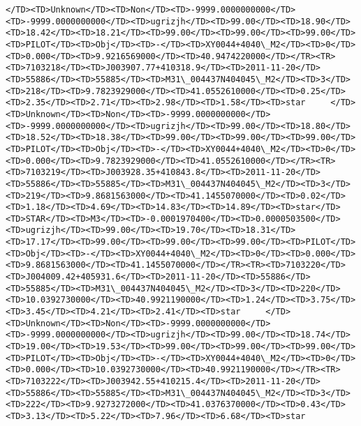 \documentclass[11pt]{article}
\begin{document}
\begin{Verbatim}[commandchars=\\\{\}]
</TD><TD>Unknown</TD><TD>Non</TD><TD>-9999.0000000000</TD><TD>-9999.0000000000</TD><TD>ugrizjh</TD><TD>99.00</TD><TD>18.90</TD><TD>18.42</TD><TD>18.21</TD><TD>99.00</TD><TD>99.00</TD><TD>99.00</TD><TD>PILOT</TD><TD>Obj</TD><TD>-</TD><TD>XY0044+4040\_M2</TD><TD>0</TD><TD>0.000</TD><TD>9.9216569000</TD><TD>40.9474220000</TD></TR><TR><TD>7103218</TD><TD>J003907.77+410318.9</TD><TD>2011-11-20</TD><TD>55886</TD><TD>55885</TD><TD>M31\_004437N404045\_M2</TD><TD>3</TD><TD>218</TD><TD>9.7823929000</TD><TD>41.0552610000</TD><TD>0.25</TD><TD>2.35</TD><TD>2.71</TD><TD>2.98</TD><TD>1.58</TD><TD>star     </TD><TD>Unknown</TD><TD>Non</TD><TD>-9999.0000000000</TD><TD>-9999.0000000000</TD><TD>ugrizjh</TD><TD>99.00</TD><TD>18.80</TD><TD>18.52</TD><TD>18.38</TD><TD>99.00</TD><TD>99.00</TD><TD>99.00</TD><TD>PILOT</TD><TD>Obj</TD><TD>-</TD><TD>XY0044+4040\_M2</TD><TD>0</TD><TD>0.000</TD><TD>9.7823929000</TD><TD>41.0552610000</TD></TR><TR><TD>7103219</TD><TD>J003928.35+410843.8</TD><TD>2011-11-20</TD><TD>55886</TD><TD>55885</TD><TD>M31\_004437N404045\_M2</TD><TD>3</TD><TD>219</TD><TD>9.8681563000</TD><TD>41.1455070000</TD><TD>0.02</TD><TD>1.18</TD><TD>4.69</TD><TD>14.83</TD><TD>14.89</TD><TD>star</TD><TD>STAR</TD><TD>M3</TD><TD>-0.0001970400</TD><TD>0.0000503500</TD><TD>ugrizjh</TD><TD>99.00</TD><TD>19.70</TD><TD>18.31</TD><TD>17.17</TD><TD>99.00</TD><TD>99.00</TD><TD>99.00</TD><TD>PILOT</TD><TD>Obj</TD><TD>-</TD><TD>XY0044+4040\_M2</TD><TD>0</TD><TD>0.000</TD><TD>9.8681563000</TD><TD>41.1455070000</TD></TR><TR><TD>7103220</TD><TD>J004009.42+405931.6</TD><TD>2011-11-20</TD><TD>55886</TD><TD>55885</TD><TD>M31\_004437N404045\_M2</TD><TD>3</TD><TD>220</TD><TD>10.0392730000</TD><TD>40.9921190000</TD><TD>1.24</TD><TD>3.75</TD><TD>3.45</TD><TD>4.21</TD><TD>2.41</TD><TD>star     </TD><TD>Unknown</TD><TD>Non</TD><TD>-9999.0000000000</TD><TD>-9999.0000000000</TD><TD>ugrizjh</TD><TD>99.00</TD><TD>18.74</TD><TD>19.00</TD><TD>19.53</TD><TD>99.00</TD><TD>99.00</TD><TD>99.00</TD><TD>PILOT</TD><TD>Obj</TD><TD>-</TD><TD>XY0044+4040\_M2</TD><TD>0</TD><TD>0.000</TD><TD>10.0392730000</TD><TD>40.9921190000</TD></TR><TR><TD>7103222</TD><TD>J003942.55+410215.4</TD><TD>2011-11-20</TD><TD>55886</TD><TD>55885</TD><TD>M31\_004437N404045\_M2</TD><TD>3</TD><TD>222</TD><TD>9.9273272000</TD><TD>41.0376370000</TD><TD>0.43</TD><TD>3.13</TD><TD>5.22</TD><TD>7.96</TD><TD>6.68</TD><TD>star     
\end{Verbatim}
\end{document}
